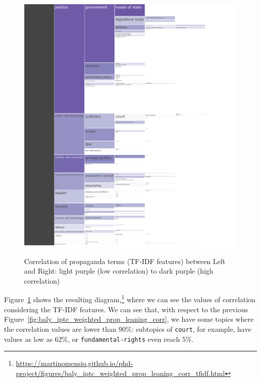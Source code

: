 \begin{figure}[!htbp]
    \centering
    \href{https://martinomensio.github.io/phd-project/figures/baly_iptc_weighted_prop_leaning_corr_tfidf.html}{\includegraphics[trim={2.65cm 0cm 0cm 0cm},clip,width=\linewidth]{figures/baly_iptc_weighted_prop_leaning_corr_tfidf.pdf}}
    \caption{Correlation of propaganda terms (TF-IDF features) between Left and Right: light purple (low correlation) to dark purple (high correlation)}
    \label{fig:baly_iptc_weighted_prop_leaning_corr_tfidf}
\end{figure}

Figure~\ref{fig:baly_iptc_weighted_prop_leaning_corr_tfidf} shows the resulting diagram,\footnote{\url{https://martinomensio.github.io/phd-project/figures/baly_iptc_weighted_prop_leaning_corr_tfidf.html}}
where we can see the values of correlation considering the TF-IDF features.
We can see that, with respect to the previous Figure~\ref{fig:baly_iptc_weighted_prop_leaning_corr}, we have some topics where the correlation values are lower than 90\%: subtopics of \texttt{court}, for example, have values as low as $62\%$, or \texttt{fundamental-rights} even reach $5\%$.



